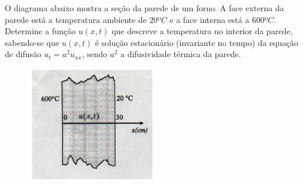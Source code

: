 \linespread{1.5}

O diagrama abaixo mostra a seção da parede de um forno. A face externa da parede está a temperatura ambiente de $20ºC$ e a face interna está a $600ºC$. Determine a função $u(x,t)$ que descreve a temperatura no interior da parede, sabendo-se que $u(x,t)$ é solução estacionário (invariante no tempo) da equação de difusão $u_t = a^2u_{xx}$, sendo $a^2$ a difusividade térmica da parede. 
\begin{figure}[H]
    \centering
    \includegraphics[width = 0.3\linewidth]{fig/edp17.png}
    \label{fig:edp17}
\end{figure}